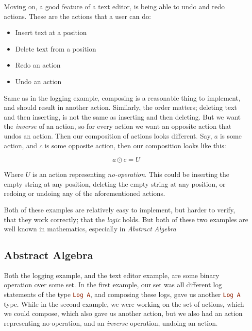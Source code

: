 Moving on, a good feature of a text editor, is being able to undo and redo
actions. These are the actions that a user can do:

\begin{itemize}
  \item Insert text at a position
  \item Delete text from a position
  \item Redo an action
  \item Undo an action
\end{itemize}

Same as in the logging example, composing is a reasonable thing to implement,
and should result in another action. Similarly, the order matters; deleting text
and then inserting, is not the same as inserting and then deleting. But we want
the \textit{inverse} of an action, so for every action we want an opposite
action that undos an action. Then our composition of actions looks different.
Say, $a$ is some action, and $c$ is some opposite action, then our composition
looks like this:

\begin{equation}
  a \odot c = U
\end{equation}

Where $U$ is an action representing \textit{no-operation}. This could be
inserting the empty string at any position, deleting the empty string at any
position, or redoing or undoing any of the aforementioned actions.

Both of these examples are relatively easy to implement, but harder to verify,
that they work correctly; that the \textit{logic} holds. But both of these two
examples are well known in mathematics, especially in \textit{Abstract Algebra}

\subsection{Abstract Algebra}

Both the logging example, and the text editor example, are some binary
operation over some set. In the first example, our set was all different log
statements of the type \lstinline[language=Haskell]{Log A}, and composing these
logs, gave us another \lstinline[language=Haskell]{Log A} type. While in the
second example, we were working on the set of actions, which we could compose,
which also gave us another action, but we also had an action representing
no-operation, and an \textit{inverse} operation, undoing an action.

